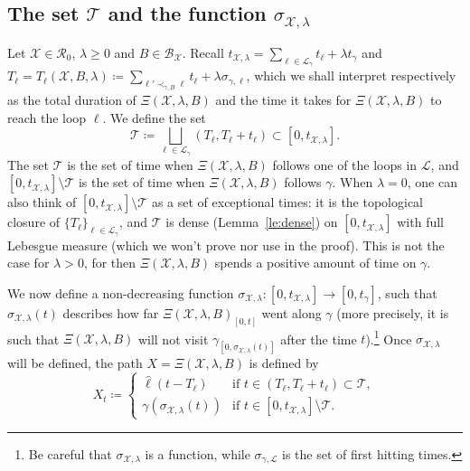 \documentclass[11pt]{article}
\def\Conf{{\mathscr{R}}}
\def\Att{{\Xi}}
\begin{document}
\subsection{The set \texorpdfstring{$\mathcal{T}$}{T} and the function \texorpdfstring{$\sigma_{\mathcal{X},\lambda}$}{sigma} }
Let $\mathcal{X}\in \Conf_0$, $\lambda\geq 0$ and $B\in \mathcal{B}_{\mathcal{X}}$.
Recall $ t_{\mathcal{X},\lambda}= \sum_{\ell\in \mathcal{L}_\gamma} t_\ell+ \lambda t_\gamma $
and
$T_\ell=T_\ell(\mathcal{X},B,\lambda) \coloneqq \sum_{\ell'\prec_{\gamma,B} \ell } t_\ell+\lambda \sigma_{\gamma,\ell} $,
which we shall interpret respectively as the total duration of $\Att(\mathcal{X},\lambda,B)$ and the time it takes for $\Att(\mathcal{X},\lambda,B)$ to reach the loop $\ell$.
We define the set
\[  \mathcal{T} \coloneqq \bigsqcup_{\ell \in \mathcal{L}_\gamma} (T_\ell, T_\ell+t_\ell)\subset [0,t_{\mathcal{X},\lambda} ]. \]
The set $\mathcal{T}$ is the set of time when $\Att(\mathcal{X},\lambda,B)$ follows one of the loops in $\mathcal{L}$, and $  [0,t_{\mathcal{X},\lambda} ]\setminus \mathcal{T} $ is the set of time when $\Att(\mathcal{X},\lambda,B)$ follows $\gamma$.
When $\lambda=0$, one can also think of $[0,t_{\mathcal{X},\lambda} ]\setminus\mathcal{T}$ as a set of exceptional times: it is the topological closure of $\{T_\ell\}_{\ell \in \mathcal{L}_\gamma}$, and $\mathcal{T}$ is dense (Lemma~\ref{le:dense}) on $[0,t_{\mathcal{X},\lambda} ]$ with full Lebesgue measure (which we won't prove nor use in the proof). This is not the case for $\lambda>0$, for then
$\Att(\mathcal{X},\lambda,B)$ spends a positive amount of time on $\gamma$.

We now define a non-decreasing function
$
\sigma_{\mathcal{X},\lambda}: [0,t_{\mathcal{X},\lambda}]\to [0,t_\gamma]$, such that $\sigma_{\mathcal{X},\lambda}(t)$ describes how far $\Att(\mathcal{X},\lambda,B)_{[0,t]}$ went along $\gamma$
(more precisely, it is such that $\Att(\mathcal{X},\lambda,B)$ will not visit $\gamma_{[0, \sigma_{\mathcal{X},\lambda}(t) ]}$ after the time $t$).\footnote{Be careful that $\sigma_{\mathcal{X},\lambda}$ is a function, while $\sigma_{\gamma,\mathcal{L}}$ is the set of first hitting times.}
Once $\sigma_{\mathcal{X},\lambda}$ will be defined, the path $X=\Att(\mathcal{X},\lambda,B)$ is defined by
\begin{equation}
\label{eq:defX}
X_t\coloneqq \left\{
\begin{array}{cc}
\hat{\ell}(t-T_\ell ) & \mbox{if } t\in (T_\ell,T_\ell+t_\ell) \subset \mathcal{T},\\
\gamma( \sigma_{\mathcal{X},\lambda}(t)  ) & \mbox{if } t\in [0,t_{\mathcal{X},\lambda} ]\setminus \mathcal{T}.
\end{array}
\right.
\end{equation}
\end{document}
